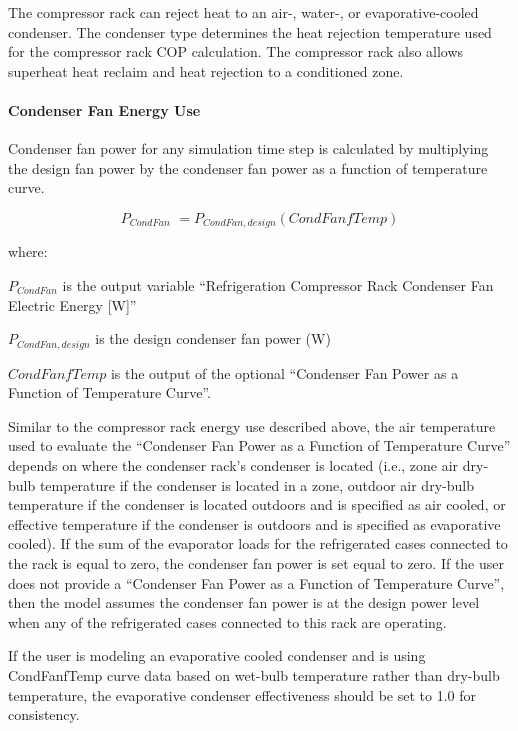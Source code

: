 The compressor rack can reject heat to an air-, water-, or evaporative-cooled condenser. The condenser type determines the heat rejection temperature used for the compressor rack COP calculation. The compressor rack also allows superheat heat reclaim and heat rejection to a conditioned zone.

\paragraph{Condenser Fan Energy Use}\label{condenser-fan-energy-use}

Condenser fan power for any simulation time step is calculated by multiplying the design fan power by the condenser fan power as a function of temperature curve.

\begin{equation}
{P_{CondFan}}\,\, = {P_{CondFan,design}}\left( {CondFanfTemp} \right)
\end{equation}

where:

\({P_{CondFan}}\) is the output variable ``Refrigeration Compressor Rack Condenser Fan Electric Energy {[}W{]}''

\({P_{CondFan,design}}\) is the design condenser fan power (W)

\(CondFanfTemp\) is the output of the optional ``Condenser Fan Power as a Function of Temperature Curve''.

Similar to the compressor rack energy use described above, the air temperature used to evaluate the ``Condenser Fan Power as a Function of Temperature Curve'' depends on where the condenser rack's condenser is located (i.e., zone air dry-bulb temperature if the condenser is located in a zone, outdoor air dry-bulb temperature if the condenser is located outdoors and is specified as air cooled, or effective temperature if the condenser is outdoors and is specified as evaporative cooled). If the sum of the evaporator loads for the refrigerated cases connected to the rack is equal to zero, the condenser fan power is set equal to zero. If the user does not provide a ``Condenser Fan Power as a Function of Temperature Curve'', then the model assumes the condenser fan power is at the design power level when any of the refrigerated cases connected to this rack are operating.

If the user is modeling an evaporative cooled condenser and is using CondFanfTemp curve data based on wet-bulb temperature rather than dry-bulb temperature, the evaporative condenser effectiveness should be set to 1.0 for consistency.

